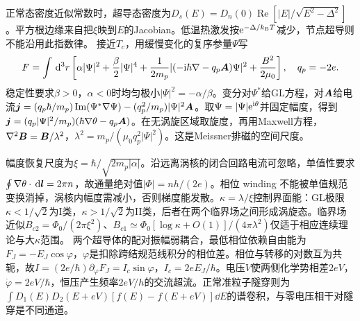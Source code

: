 正常态密度近似常数时，超导态密度为$D_s(E)=D_n(0)\operatorname{Re}[|E|/\sqrt{E^2-\Delta^2}]$。平方根边缘来自把$\xi$映到$E$的Jacobian。低温热激发按$\mathrm e^{-\Delta/k_{\mathrm B} T}$减少，节点超导则不能沿用此指数律。
接近$T_c$，用缓慢变化的复序参量$\Psi$写
\begin{equation}
F=\int\,\mathrm d^3r\left[\alpha|\Psi|^2+\frac\beta2|\Psi|^4+\frac1{2m_p}|(-\mathrm i\hbar\nabla-q_p\boldsymbol{A})\Psi|^2+\frac{B^2}{2\mu_0}\right],\quad q_p=-2e.
\end{equation}
稳定性要求$\beta>0$，$\alpha<0$时均匀极小$|\Psi|^2=-\alpha/\beta$。变分对$\Psi^*$给GL方程，对$\boldsymbol{A}$给电流$\boldsymbol{j}=(q_p\hbar/m_p)\operatorname{Im}(\Psi^*\nabla\Psi)-(q_p^2/m_p)|\Psi|^2\boldsymbol{A}$。取$\Psi=|\Psi|\mathrm e^{\mathrm i\theta}$并固定幅度，得到$\boldsymbol{j}=(q_p|\Psi|^2/m_p)(\hbar\nabla\theta-q_p\boldsymbol{A})$。在无涡旋区域取旋度，再用Maxwell方程，$\nabla^2\boldsymbol{B}=\boldsymbol{B}/\lambda^2$，$\lambda^2=m_p/(\mu_0q_p^2|\Psi|^2)$。这是Meissner排磁的空间尺度。

幅度恢复尺度为$\xi=\hbar/\sqrt{2m_p|\alpha|}$。沿远离涡核的闭合回路电流可忽略，单值性要求$\oint\nabla\theta\cdot\,\mathrm d\boldsymbol{l}=2\pi n$，故通量绝对值$|\Phi|=n h/(2e)$。相位 winding 不能被单值规范变换消掉，涡核内幅度需减小，否则梯度能发散。$\kappa=\lambda/\xi$控制界面能：GL极限$\kappa<1/\sqrt2$为I类，$\kappa>1/\sqrt2$为II类，后者在两个临界场之间形成涡旋态。临界场近似$B_{c2}=\Phi_0/(2\pi\xi^2)$、$B_{c1}\simeq\Phi_0[\log\kappa+O(1)]/(4\pi\lambda^2)$仅适于相应连续理论与大$\kappa$范围。
两个超导体的配对振幅弱耦合，最低相位依赖自由能为$F_J=-E_J\cos\varphi$，$\varphi$是扣除跨结规范线积分的相位差。相位与转移的对数互为共轭，故$I=(2e/\hbar)\partial_\varphi F_J=I_c\sin\varphi$，$I_c=2eE_J/\hbar$。电压$V$使两侧化学势相差$2eV$，$\dot\varphi=2eV/\hbar$，恒压产生频率$2eV/h$的交流超流。正常准粒子隧穿则为$\int D_1(E)D_2(E+eV)[f(E)-f(E+eV)]\dd E$的谱卷积，与零电压相干对隧穿是不同通道。
